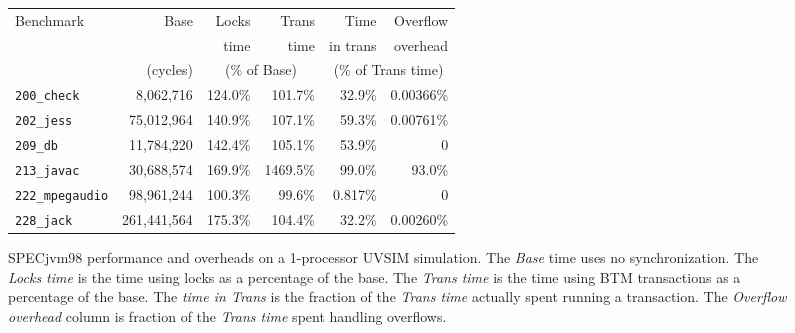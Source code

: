 \documentclass[preprint]{rdbacmconf}
\begin{document}
\begin{figure*}
\footnotesize
\begin{center}
\begin{tabular}{lr|rr|rr}
Benchmark                 &  Base       & Locks         & Trans              & Time                     & Overflow       \\
                          &             & time          & time               & in trans              & overhead       \\
                          &  (cycles)   & \multicolumn{2}{c|}{(\% of Base)}   & \multicolumn{2}{c}{(\% of Trans time)}                 \\ \hline
\texttt{200\_check}       &   8,062,716 & 124.0\%       &  101.7\%           & 32.9\%           & 0.00366\%      \\
\texttt{202\_jess}        &  75,012,964 & 140.9\%       &  107.1\%           & 59.3\%           & 0.00761\%      \\
\texttt{209\_db}          &  11,784,220 & 142.4\%       &  105.1\%           & 53.9\%           & 0              \\
\texttt{213\_javac}       &  30,688,574 & 169.9\%       & 1469.5\%           & 99.0\%           & 93.0\%         \\
\texttt{222\_mpegaudio}&  98,961,244    & 100.3\%       &   99.6\%           & 0.817\%          & 0              \\
\texttt{228\_jack}        & 261,441,564 & 175.3\%       &  104.4\%           & 32.2\%           & 0.00260\%      \\
\end{tabular}
\end{center}
\caption{SPECjvm98 performance and overheads on a 1-processor UVSIM simulation. The {\em Base }
 time uses no synchronization.  The {\em Locks time} is the time using
 locks as a percentage of the base.  The {\em Trans time} is the time using BTM
 transactions as a percentage of the base. The
 {\em time in Trans} is the fraction of the {\em Trans time} actually
 spent running a transaction.  The {\em
 Overflow overhead} column is fraction of the {\em Trans time}
 spent handling overflows.}
\label{fig:specperf}
\end{figure*}
\end{document}
